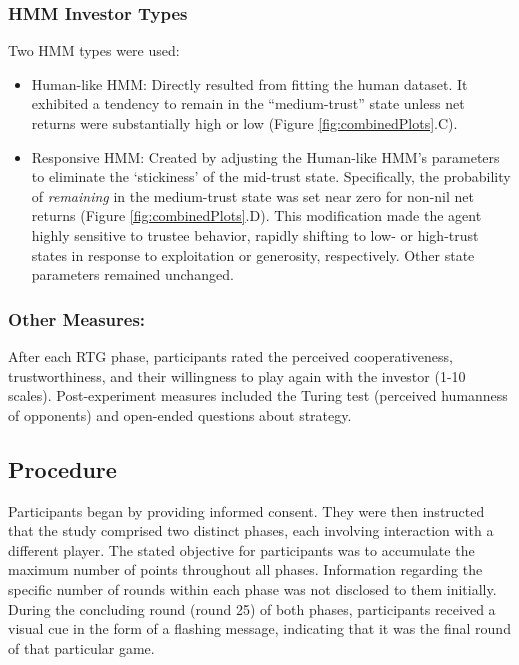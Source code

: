 \documentclass[
]{article}
\providecommand{\tightlist}{%
  \setlength{\itemsep}{0pt}\setlength{\parskip}{0pt}}
\begin{document}
\subsubsection{HMM Investor Types}\label{hmm-investor-types}

Two HMM types were used:

\begin{itemize}
\tightlist
\item
  Human-like HMM: Directly resulted from fitting the human dataset. It exhibited a tendency to remain in the ``medium-trust'' state unless net returns were substantially high or low (Figure \ref{fig:combinedPlots}.C).
\item
  Responsive HMM: Created by adjusting the Human-like HMM's parameters to eliminate the `stickiness' of the mid-trust state. Specifically, the probability of \emph{remaining} in the medium-trust state was set near zero for non-nil net returns (Figure \ref{fig:combinedPlots}.D). This modification made the agent highly sensitive to trustee behavior, rapidly shifting to low- or high-trust states in response to exploitation or generosity, respectively. Other state parameters remained unchanged.
\end{itemize}

\subsubsection{Other Measures:}\label{other-measures}

After each RTG phase, participants rated the perceived cooperativeness, trustworthiness, and their willingness to play again with the investor (1-10 scales). Post-experiment measures included the Turing test (perceived humanness of opponents) and open-ended questions about strategy.

\subsection{Procedure}\label{procedure}

Participants began by providing informed consent. They were then instructed that the study comprised two distinct phases, each involving interaction with a different player. The stated objective for participants was to accumulate the maximum number of points throughout all phases. Information regarding the specific number of rounds within each phase was not disclosed to them initially. During the concluding round (round 25) of both phases, participants received a visual cue in the form of a flashing message, indicating that it was the final round of that particular game.
\end{document}
